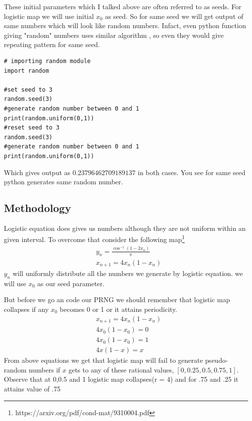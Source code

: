 \documentclass{report}
\begin{document}
These initial parameters which I talked above are often referred to as seeds. For logistic map we will use initial $x_0$ as seed. So for same seed we will get output of same  numbers which will look like random numbers. Infact, even python function giving "random" numbers uses similar algorithm , so even they would give repeating pattern for same seed.

\begin{lstlisting}
# importing random module
import random

#set seed to 3
random.seed(3)
#generate random number between 0 and 1
print(random.uniform(0,1))
#reset seed to 3
random.seed(3)
#generate random number between 0 and 1
print(random.uniform(0,1))
\end{lstlisting}

Which gives output as $0.23796462709189137$ in both cases. You see for same seed python generates same random number.
\newpage

\subsection{Methodology}
Logistic equation does gives us numbers although they are not uniform within an given interval. To overcome that consider the following map\footnote[1]{https://arxiv.org/pdf/cond-mat/9310004.pdf}
\begin{align}
    &y_n = \frac{\cos^{-1}(1-2x_n)}{\pi}  \\
    &x_{n+1} = 4x_n(1-x_n) \nonumber
\end{align}
$y_n$ will uniformly distribute all the numbers we generate by logistic equation. we will use $x_0$ as our seed parameter.

But before we go an code our PRNG we should remember that logistic map collapses if any $x_0$ becomes 0 or 1 or it attains periodicity.
\begin{align}
    &x_{n+1} = 4x_n(1-x_n) \nonumber \\
    &4x_0(1-x_0) = 0 \nonumber \\
    &4x_0(1-x_0) = 1 \nonumber \\
    &4x(1-x) = x \nonumber
\end{align}
From above equations we get that logistic map will fail to generate pseudo-random numbers if $x$ gets to any of these rational values, $[0 , 0.25 , 0.5 , 0.75 , 1 ]$. Observe that at 0,0.5 and 1 logistic map collapses(r = 4) and for .75 and .25 it attains value of .75
\end{document}
